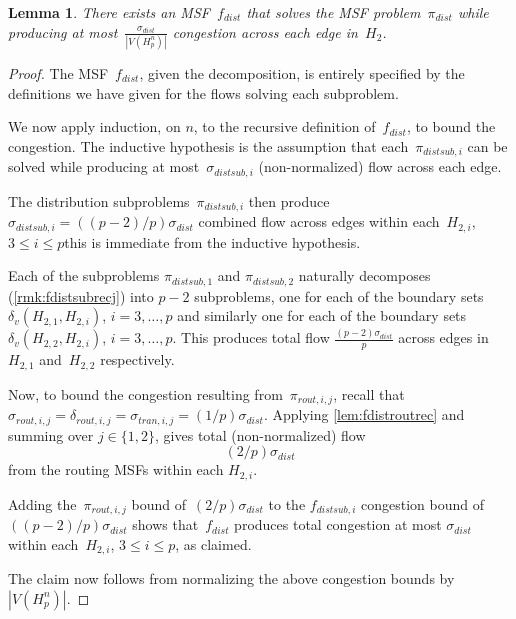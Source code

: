 \documentclass[10pt,a4paper]{amsart}
\newtheorem{lemma}{Lemma}
\begin{document}
\begin{lemma}
\label{lem:hanpartialcong}
There exists an MSF~$f_{dist}$ that solves the MSF problem~$\pi_{dist}$ while producing at most~$\frac{\sigma_{dist}}{|V(H_p^n)|}$ congestion across each edge in~$H_2$.
\end{lemma}

\begin{proof}

The MSF~$f_{dist}$, given the decomposition, is entirely specified by the definitions we have given for the flows solving each subproblem.

We now apply induction, on $n$, to the recursive definition of~$f_{dist}$, to bound the congestion. The inductive hypothesis is the assumption that each~$\pi_{distsub,i}$ can be solved while producing at most~$\sigma_{distsub,i}$ (non-normalized) flow across each edge.

The distribution subproblems~$\pi_{distsub,i}$ then produce $\sigma_{distsub,i} = ((p-2)/p)\sigma_{dist}$ combined flow across edges within each~$H_{2,i}$,  $3 \leq i \leq p$\textemdash this is immediate from the inductive hypothesis.

Each of the subproblems $\pi_{distsub,1}$ and $\pi_{distsub,2}$ naturally decomposes (\cref{rmk:fdistsubrecj}) into $p-2$ subproblems, one for each of the boundary sets $\delta_v(H_{2,1}, H_{2,i})$, $i = 3, \dots, p$ and similarly one for each of the boundary sets $\delta_v(H_{2,2}, H_{2,i})$, $i = 3, \dots, p$. This produces total flow $\frac{(p-2)\sigma_{dist}}{p}$ across edges in~$H_{2,1}$ and~$H_{2,2}$ respectively.

Now, to bound the congestion resulting from~$\pi_{rout,i,j}$, recall that $\sigma_{rout,i,j} = \delta_{rout,i,j} = \sigma_{tran,i,j} = (1/p)\sigma_{dist}$. Applying \cref{lem:fdistroutrec} and summing over $j \in \{1, 2\}$, gives total (non-normalized) flow
$$(2/p)\sigma_{dist}$$
from the routing MSFs within each $H_{2,i}$. 

Adding the~$\pi_{rout,i,j}$ bound of~$(2/p)\sigma_{dist}$ to the $f_{distsub,i}$ congestion bound of $((p-2)/p)\sigma_{dist}$ shows that~$f_{dist}$ produces total congestion at most $\sigma_{dist}$ within each~$H_{2,i}$, $3 \leq i \leq p$, as claimed.

The claim now follows from normalizing the above congestion bounds by $|V(H_p^n)|$.
\end{proof}
\end{document}
